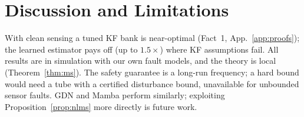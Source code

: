 \section{Discussion and Limitations}
\label{sec:discussion}
With clean sensing a tuned KF bank is near-optimal (Fact~1, App.~\ref{app:proofs}); the learned estimator pays off (up to $1.5\times$) where KF assumptions fail. All results are in simulation with our own fault models, and the theory is local (Theorem~\ref{thm:ms}). The safety guarantee is a long-run frequency; a hard bound would need a tube \citep{mayne2005robust} with a certified disturbance bound, unavailable for unbounded sensor faults. GDN and Mamba perform similarly; exploiting Proposition~\ref{prop:nlms} more directly is future work.
